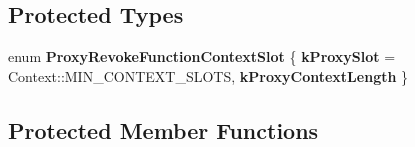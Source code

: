 \subsection*{Protected Types}
\begin{DoxyCompactItemize}
\item 
\mbox{\label{classv8_1_1internal_1_1ProxiesCodeStubAssembler_adcebd5bf6071a0fe7476ffac319b1b39}} 
enum {\bfseries Proxy\+Revoke\+Function\+Context\+Slot} \{ {\bfseries k\+Proxy\+Slot} = Context\+:\+:M\+I\+N\+\_\+\+C\+O\+N\+T\+E\+X\+T\+\_\+\+S\+L\+O\+TS, 
{\bfseries k\+Proxy\+Context\+Length}
 \}
\end{DoxyCompactItemize}
\subsection*{Protected Member Functions}
